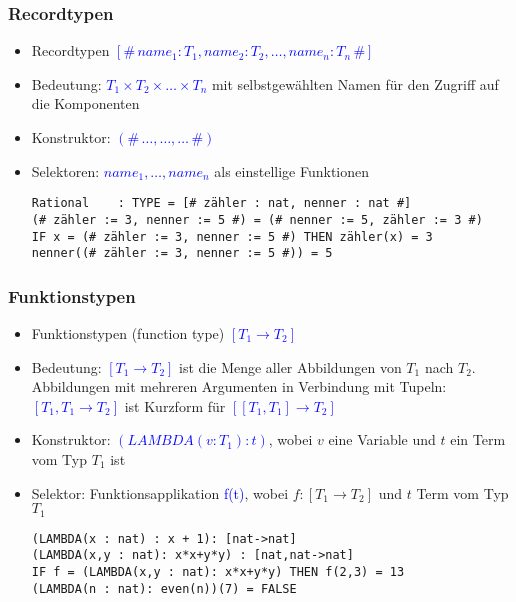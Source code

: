 \documentclass{scrartcl}
\begin{document}
\subsubsection{Recordtypen}

\begin{itemize}
	\item Recordtypen \textcolor{blue}{$ [\# \, name_1 : T_1, name_2 : T_2, \ldots, name_n : T_n \, \#] $}
	\item Bedeutung: \textcolor{blue}{$ T_1 \times T_2 \times \ldots \times T_n $} mit selbstgewählten Namen für den Zugriff auf die Komponenten
	\item Konstruktor: \textcolor{blue}{$ (\# \, \ldots, \ldots, \ldots \, \#) $}
	\item Selektoren: \textcolor{blue}{$ name_1, \ldots, name_n $} als einstellige Funktionen
	\begin{lstlisting}
Rational	: TYPE = [# zähler : nat, nenner : nat #]
(# zähler := 3, nenner := 5 #) = (# nenner := 5, zähler := 3 #)
IF x = (# zähler := 3, nenner := 5 #) THEN zähler(x) = 3
nenner((# zähler := 3, nenner := 5 #)) = 5
	\end{lstlisting}
\end{itemize}

\subsubsection{Funktionstypen}

\begin{itemize}
	\item Funktionstypen (function type) \textcolor{blue}{$ [T_1 \rightarrow T_2] $}
	\item Bedeutung: \textcolor{blue}{$ [T_1 \rightarrow T_2] $} ist die Menge aller Abbildungen von $ T_1 $ nach $ T_2 $. Abbildungen mit mehreren Argumenten in Verbindung mit Tupeln: \\
	\textcolor{blue}{$ [T_1,T_1 \rightarrow T_2] $} ist Kurzform für \textcolor{blue}{$ [[T_1,T_1] \rightarrow T_2] $}
	\item Konstruktor: \textcolor{blue}{$ (LAMBDA(v : T_1) : t) $}, wobei $ v $ eine Variable und $ t $ ein Term vom Typ $ T_1 $ ist
	\item Selektor: Funktionsapplikation \textcolor{blue}{f(t)}, wobei $ f : [T_1 \rightarrow T_2] $ und $ t $ Term vom Typ $ T_1 $
	\begin{lstlisting}
(LAMBDA(x : nat) : x + 1): [nat->nat]
(LAMBDA(x,y : nat): x*x+y*y) : [nat,nat->nat]
IF f = (LAMBDA(x,y : nat): x*x+y*y) THEN f(2,3) = 13
(LAMBDA(n : nat): even(n))(7) = FALSE
	\end{lstlisting}
\end{itemize}
\end{document}
